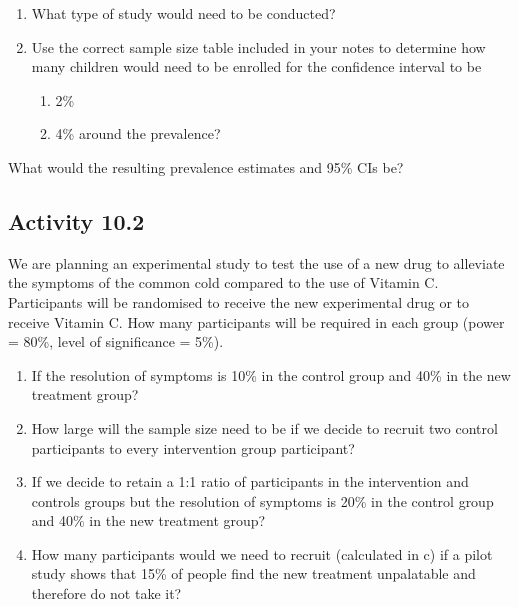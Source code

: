 \documentclass[
]{memoir}
\providecommand{\tightlist}{%
  \setlength{\itemsep}{0pt}\setlength{\parskip}{0pt}}
\begin{document}
\begin{enumerate}
\def\labelenumi{\alph{enumi})}
\tightlist
\item
  What type of study would need to be conducted?
\item
  Use the correct sample size table included in your notes to determine how many children would need to be enrolled for the confidence interval to be

  \begin{enumerate}
  \def\labelenumii{\roman{enumii}.}
  \tightlist
  \item
    2\%
  \item
    4\% around the prevalence?
  \end{enumerate}
\end{enumerate}

What would the resulting prevalence estimates and 95\% CIs be?

\hypertarget{activity-10.2}{%
\subsection*{Activity 10.2}\label{activity-10.2}}

We are planning an experimental study to test the use of a new drug to alleviate the symptoms of the common cold compared to the use of Vitamin C. Participants will be randomised to receive the new experimental drug or to receive Vitamin C. How many participants will be required in each group (power = 80\%, level of significance = 5\%).

\begin{enumerate}
\def\labelenumi{\alph{enumi})}
\tightlist
\item
  If the resolution of symptoms is 10\% in the control group and 40\% in the new treatment group?
\item
  How large will the sample size need to be if we decide to recruit two control participants to every intervention group participant?
\item
  If we decide to retain a 1:1 ratio of participants in the intervention and controls groups but the resolution of symptoms is 20\% in the control group and 40\% in the new treatment group?
\item
  How many participants would we need to recruit (calculated in c) if a pilot study shows that 15\% of people find the new treatment unpalatable and therefore do not take it?
\end{enumerate}
\end{document}

